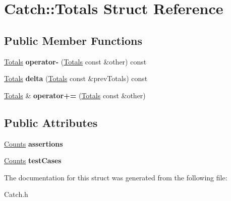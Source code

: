 \hypertarget{struct_catch_1_1_totals}{\section{Catch\-:\-:Totals Struct Reference}
\label{struct_catch_1_1_totals}
}
\subsection*{Public Member Functions}
\begin{DoxyCompactItemize}
\item 
\hypertarget{struct_catch_1_1_totals_abe15cd8a82ba9a4868dd7a542add827c}{\hyperlink{struct_catch_1_1_totals}{Totals} {\bfseries operator-\/} (\hyperlink{struct_catch_1_1_totals}{Totals} const \&other) const }\label{struct_catch_1_1_totals_abe15cd8a82ba9a4868dd7a542add827c}

\item 
\hypertarget{struct_catch_1_1_totals_a3dee0f599c081a8360c0112fb1dafe8f}{\hyperlink{struct_catch_1_1_totals}{Totals} {\bfseries delta} (\hyperlink{struct_catch_1_1_totals}{Totals} const \&prev\-Totals) const }\label{struct_catch_1_1_totals_a3dee0f599c081a8360c0112fb1dafe8f}

\item 
\hypertarget{struct_catch_1_1_totals_a574015076e54cc405c70b053e3356e43}{\hyperlink{struct_catch_1_1_totals}{Totals} \& {\bfseries operator+=} (\hyperlink{struct_catch_1_1_totals}{Totals} const \&other)}\label{struct_catch_1_1_totals_a574015076e54cc405c70b053e3356e43}

\end{DoxyCompactItemize}
\subsection*{Public Attributes}
\begin{DoxyCompactItemize}
\item 
\hypertarget{struct_catch_1_1_totals_a885ded66df752147b30c3d45aa602ec9}{\hyperlink{struct_catch_1_1_counts}{Counts} {\bfseries assertions}}\label{struct_catch_1_1_totals_a885ded66df752147b30c3d45aa602ec9}

\item 
\hypertarget{struct_catch_1_1_totals_adb195fe477aedee2ecea88c888f16506}{\hyperlink{struct_catch_1_1_counts}{Counts} {\bfseries test\-Cases}}\label{struct_catch_1_1_totals_adb195fe477aedee2ecea88c888f16506}

\end{DoxyCompactItemize}


The documentation for this struct was generated from the following file\-:\begin{DoxyCompactItemize}
\item 
Catch.\-h\end{DoxyCompactItemize}

